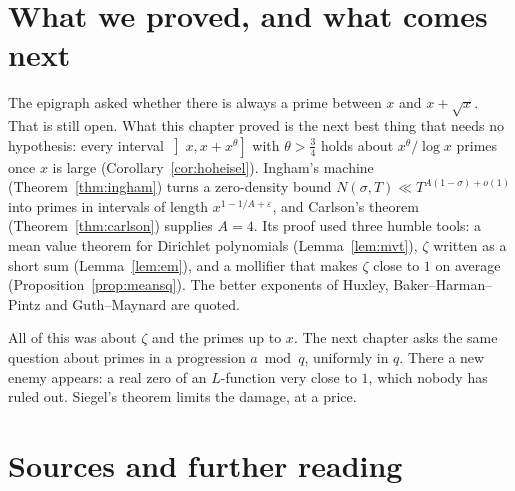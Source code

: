 \section{What we proved, and what comes next}

The epigraph asked whether there is always a prime between $x$ and $x+\sqrt x$. That is still open. What this chapter proved is the next best thing that needs no hypothesis: every interval $\left]x,x+x^\theta\right]$ with $\theta>\frac34$ holds about $x^\theta/\log x$ primes once $x$ is large (Corollary~\ref{cor:hoheisel}). Ingham's machine (Theorem~\ref{thm:ingham}) turns a zero-density bound $N(\sigma,T)\ll T^{A(1-\sigma)+o(1)}$ into primes in intervals of length $x^{1-1/A+\varepsilon}$, and Carlson's theorem (Theorem~\ref{thm:carlson}) supplies $A=4$. Its proof used three humble tools: a mean value theorem for Dirichlet polynomials (Lemma~\ref{lem:mvt}), $\zeta$ written as a short sum (Lemma~\ref{lem:em}), and a mollifier that makes $\zeta$ close to $1$ on average (Proposition~\ref{prop:meansq}). The better exponents of Huxley, Baker--Harman--Pintz and Guth--Maynard are quoted.

All of this was about $\zeta$ and the primes up to $x$. The next chapter asks the same question about primes in a progression $a\bmod q$, uniformly in $q$. There a new enemy appears: a real zero of an $L$-function very close to $1$, which nobody has ruled out. Siegel's theorem limits the damage, at a price.

\section*{Sources and further reading}

